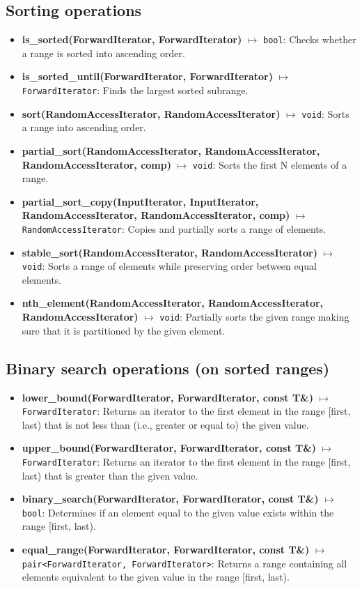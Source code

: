 \documentclass{report}
\begin{document}
    \subsection{Sorting operations}
    \begin{itemize}
        \item \textbf{is\_sorted(ForwardIterator, ForwardIterator)} \(\mapsto\) \texttt{bool}: Checks whether a range is sorted into ascending order.
        \item \textbf{is\_sorted\_until(ForwardIterator, ForwardIterator)} \(\mapsto\) \texttt{ForwardIterator}: Finds the largest sorted subrange.
        \item \textbf{sort(RandomAccessIterator, RandomAccessIterator)} \(\mapsto\) \texttt{void}: Sorts a range into ascending order.
        \item \textbf{partial\_sort(RandomAccessIterator, RandomAccessIterator, RandomAccessIterator, comp)} \(\mapsto\) \texttt{void}: Sorts the first N elements of a range.
        \item \textbf{partial\_sort\_copy(InputIterator, InputIterator, RandomAccessIterator, RandomAccessIterator, comp)} \(\mapsto\) \texttt{RandomAccessIterator}: Copies and partially sorts a range of elements.
        \item \textbf{stable\_sort(RandomAccessIterator, RandomAccessIterator)} \(\mapsto\) \texttt{void}: Sorts a range of elements while preserving order between equal elements.
        \item \textbf{nth\_element(RandomAccessIterator, RandomAccessIterator, RandomAccessIterator)} \(\mapsto\) \texttt{void}: Partially sorts the given range making sure that it is partitioned by the given element.
    \end{itemize}

    \bigbreak \noindent 
    \subsection{Binary search operations (on sorted ranges)}
    \begin{itemize}
          \item \textbf{lower\_bound(ForwardIterator, ForwardIterator, const T\&)} \(\mapsto\) \texttt{ForwardIterator}: Returns an iterator to the first element in the range [first, last) that is not less than (i.e., greater or equal to) the given value.
        \item \textbf{upper\_bound(ForwardIterator, ForwardIterator, const T\&)} \(\mapsto\) \texttt{ForwardIterator}: Returns an iterator to the first element in the range [first, last) that is greater than the given value.
        \item \textbf{binary\_search(ForwardIterator, ForwardIterator, const T\&)} \(\mapsto\) \texttt{bool}: Determines if an element equal to the given value exists within the range [first, last).
        \item \textbf{equal\_range(ForwardIterator, ForwardIterator, const T\&)} \(\mapsto\) \texttt{pair<ForwardIterator, ForwardIterator>}: Returns a range containing all elements equivalent to the given value in the range [first, last).
    \end{itemize}
\end{document}
